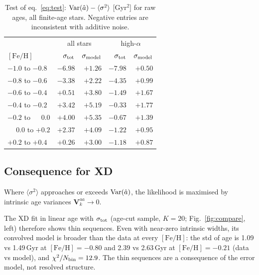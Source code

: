 \documentclass[11pt,a4paper]{article}
\newcommand{\feh}{\ensuremath{[\mathrm{Fe/H}]}}
\begin{document}
\begin{table}[t]
  \centering\small
  \caption{Test of eq.~\eqref{eq:test}: ${\rm Var}(\hat a)-\langle\sigma^2\rangle$ [Gyr$^2$] for raw ages, all finite-age stars. Negative entries are inconsistent with additive noise.}
  \label{tab:test}
  \begin{tabular}{lrrrr}
    \toprule
    & \multicolumn{2}{c}{all stars} & \multicolumn{2}{c}{high-$\alpha$}\\
    \feh{} & $\sigma_{\rm tot}$ & $\sigma_{\rm model}$ & $\sigma_{\rm tot}$ & $\sigma_{\rm model}$\\
    \midrule
    $-1.0$ to $-0.8$ & $-6.98$ & $+1.26$ & $-7.98$ & $+0.50$\\
    $-0.8$ to $-0.6$ & $-3.38$ & $+2.22$ & $-4.35$ & $+0.99$\\
    $-0.6$ to $-0.4$ & $+0.51$ & $+3.80$ & $-1.49$ & $+1.67$\\
    $-0.4$ to $-0.2$ & $+3.42$ & $+5.19$ & $-0.33$ & $+1.77$\\
    $-0.2$ to $\phantom{+}0.0$ & $+4.00$ & $+5.35$ & $-0.67$ & $+1.39$\\
    $\phantom{+}0.0$ to $+0.2$ & $+2.37$ & $+4.09$ & $-1.22$ & $+0.95$\\
    $+0.2$ to $+0.4$ & $+0.26$ & $+3.00$ & $-1.18$ & $+0.87$\\
    \bottomrule
  \end{tabular}
\end{table}

\subsection{Consequence for XD}
Where $\langle\sigma^2\rangle$ approaches or exceeds ${\rm Var}(\hat a)$, the likelihood is maximised by intrinsic age variances $\mathbf V_k^{aa}\to0$.

The XD fit in linear age with $\sigma_{\rm tot}$ (age-cut sample, $K=20$; Fig.~\ref{fig:compare}, left) therefore shows thin sequences. Even with near-zero intrinsic widths, its convolved model is broader than the data at every \feh{}: the std of age is 1.09 vs 1.49\,Gyr at $\feh=-0.80$ and 2.39 vs 2.63\,Gyr at $\feh=-0.21$ (data vs model), and $\chi^2/N_{\rm bin}=12.9$. The thin sequences are a consequence of the error model, not resolved structure.
\end{document}
